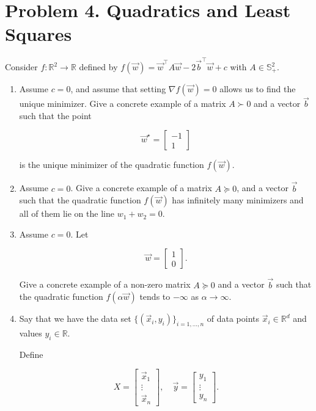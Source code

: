 \documentclass[
  12pt,
]{fphw}
\begin{document}

\newpage
\section*{Problem 4. Quadratics and Least Squares}

Consider $f: \mathbb{R}^2 \to \mathbb{R}$ defined by $f(\vec{w})=\vec{w}^{\top}A\vec{w}-2\vec{b}^{\top}\vec{w}+c$ with $A\in\mathbb{S}_{+}^{2}$.
\begin{enumerate}

\item[(a)] Assume $c = 0$, and assume that setting $\nabla f(\vec{w}) = 0$ allows us to find the unique minimizer. Give a concrete example of a matrix $A \succ 0$ and a vector $\vec{b}$ such that the point

\[
\vec{w}^\star =
\begin{bmatrix}
-1 \\
1
\end{bmatrix}
\]

is the unique minimizer of the quadratic function $f(\vec{w})$.

\item[(b)] Assume $c = 0$. Give a concrete example of a matrix $A \succeq 0$, and a vector $\vec{b}$ such that the quadratic function $f(\vec{w})$ has infinitely many minimizers and all of them lie on the line $w_1 + w_2 = 0$.

\item[(c)] Assume $c = 0$. Let

\[
\vec{w} =
\begin{bmatrix}
1 \\
0
\end{bmatrix}.
\]

Give a concrete example of a non-zero matrix $A \succeq 0$ and a vector $\vec{b}$ such that the quadratic function $f(\alpha \vec{w})$ tends to $-\infty$ as $\alpha \to \infty$.

\item[(d)] Say that we have the data set $\{(\vec{x}_i, y_i)\}_{i=1,...,n}$ of data points $\vec{x}_i \in \mathbb{R}^d$ and values $y_i \in \mathbb{R}$.

Define

\[
X =
\begin{bmatrix}
\vec{x}_1 \\
\vdots \\
\vec{x}_n
\end{bmatrix},
\quad
\vec{y} =
\begin{bmatrix}
y_1 \\
\vdots \\
y_n
\end{bmatrix}.
\]


\end{enumerate}
\end{document}
